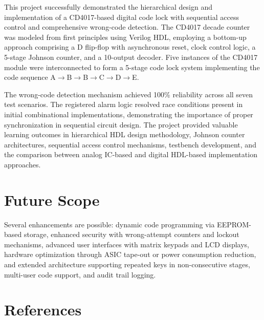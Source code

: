 \documentclass[12pt,a4paper]{report}
\begin{document}
This project successfully demonstrated the hierarchical design and implementation of a CD4017-based digital code lock with sequential access control and comprehensive wrong-code detection. The CD4017 decade counter was modeled from first principles using Verilog HDL, employing a bottom-up approach comprising a D flip-flop with asynchronous reset, clock control logic, a 5-stage Johnson counter, and a 10-output decoder. Five instances of the CD4017 module were interconnected to form a 5-stage code lock system implementing the code sequence A$\rightarrow$B$\rightarrow$B$\rightarrow$C$\rightarrow$D$\rightarrow$E.

The wrong-code detection mechanism achieved 100\% reliability across all seven test scenarios. The registered alarm logic resolved race conditions present in initial combinational implementations, demonstrating the importance of proper synchronization in sequential circuit design. The project provided valuable learning outcomes in hierarchical HDL design methodology, Johnson counter architectures, sequential access control mechanisms, testbench development, and the comparison between analog IC-based and digital HDL-based implementation approaches.

\chapter{Future Scope}

Several enhancements are possible: dynamic code programming via EEPROM-based storage, enhanced security with wrong-attempt counters and lockout mechanisms, advanced user interfaces with matrix keypads and LCD displays, hardware optimization through ASIC tape-out or power consumption reduction, and extended architecture supporting repeated keys in non-consecutive stages, multi-user code support, and audit trail logging.

\chapter*{References}
\end{document}
